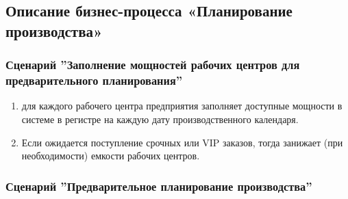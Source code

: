 \newpage
\subsection{Описание бизнес-процесса «Планирование производства»}
\label{bp:plan}



\subsubsection{Сценарий ''Заполнение мощностей рабочих центров для предварительного планирования''}
\label{bp:plan_1}


\begin{enumerate}

\item \planner для каждого рабочего центра предприятия заполняет доступные мощности в системе \gofro в регистре  на каждую дату производственного календаря.
\item Если ожидается поступление срочных или VIP заказов, тогда \planner занижает (при необходимости) емкости рабочих центров.
\end{enumerate}


\ifnum{}    %
\subsubsection{Сценарий ''Предварительное планирование производства''} 
\label{bp:plan_2}




